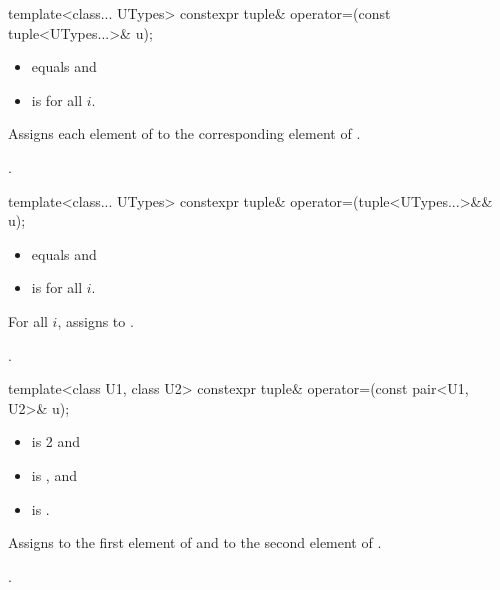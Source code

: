 %
\begin{itemdecl}
template<class... UTypes> constexpr tuple& operator=(const tuple<UTypes...>& u);
\end{itemdecl}

\begin{itemdescr}
\pnum
\constraints
\begin{itemize}
\item {} equals  and
\item {} is  for all $i$.
\end{itemize}

\pnum
\effects
Assigns each element of  to the corresponding element
of .

\pnum
\returns
{}.
\end{itemdescr}

%
\begin{itemdecl}
template<class... UTypes> constexpr tuple& operator=(tuple<UTypes...>&& u);
\end{itemdecl}

\begin{itemdescr}
\pnum
\constraints
\begin{itemize}
\item {} equals  and
\item {} is  for all $i$.
\end{itemize}

\pnum
\effects
For all $i$, assigns  to
.

\pnum
\returns
{}.
\end{itemdescr}

%
%
\begin{itemdecl}
template<class U1, class U2> constexpr tuple& operator=(const pair<U1, U2>& u);
\end{itemdecl}

\begin{itemdescr}
\pnum
\constraints
\begin{itemize}
\item {} is 2 and
\item {} is , and
\item {} is .
\end{itemize}

\pnum
\effects
Assigns  to the first element of 
and  to the second element of .

\pnum
\returns
{}.
\end{itemdescr}

